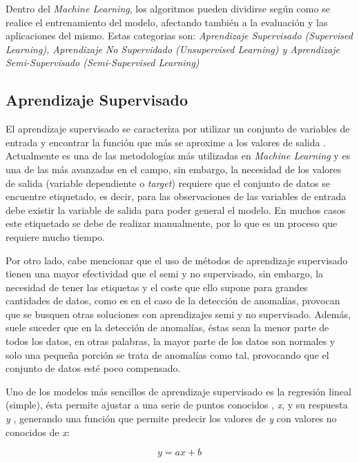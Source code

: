 Dentro del \textit{Machine Learning}, los algoritmos pueden dividirse según como se realice el entrenamiento del modelo, afectando también a la evaluación y las aplicaciones del mismo. Estas categorias son: \textit{Aprendizaje Supervisado (Supervised Learning), Aprendizaje No Supervidado (Unsupervised Learning) y Aprendizaje Semi-Supervisado (Semi-Supervised Learning)}

\subsection{Aprendizaje Supervisado}

El aprendizaje supervisado se caracteriza por utilizar un conjunto de variables de entrada y encontrar la función que más se aproxime a los valores de salida \cite{Liu2012}. Actualmente es una de las metodologías más utilizadas en \textit{Machine Learning} y es una de las más avanzadas en el campo, sin embargo, la necesidad de los valores de salida (variable dependiente o \textit{target}) requiere que el conjunto de datos se encuentre etiquetado, es decir, para las observaciones de las variables de entrada debe existir la variable de salida para poder general el modelo. En muchos casos este etiquetado se debe de realizar manualmente, por lo que es un proceso que requiere mucho tiempo.

Por otro lado, cabe mencionar que el uso de métodos de aprendizaje supervisado tienen una mayor efectividad que el semi y no supervisado, sin embargo, la necesidad de tener las etiquetas y el coste que ello supone para grandes cantidades de datos, como es en el caso de la detección de anomalías, provocan que se busquen otras soluciones con aprendizajes semi y no supervisado. Además, suele suceder que en la detección de anomalías, éstas sean la menor parte de todos los datos, en otras palabras, la mayor parte de los datos son normales y solo una pequeña porción se trata de anomalías como tal, provocando que el conjunto de datos esté poco compensado.

Uno de los modelos más sencillos de aprendizaje supervisado es la regresión lineal (simple), ésta permite ajustar a una serie de puntos conocidos , \textit{x}, y su respuesta \textit{y} \cite{james2013introduction}, generando una función que permite predecir los valores de \textit{y} con valores no conocidos de \textit{x}:

\begin{equation}
y = ax + b 
\end{equation}

